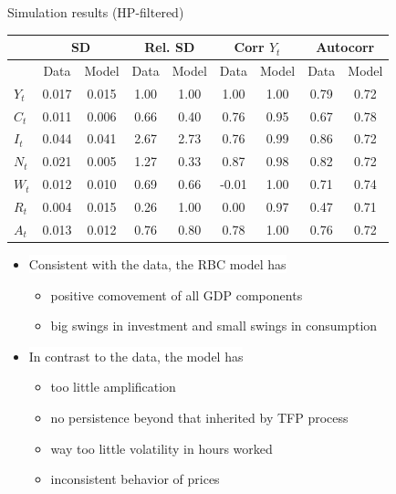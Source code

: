 \documentclass[9pt,xcolor={dvipsnames}]{beamer}
\newcommand{\bit}{\begin{itemize}}
\newcommand{\eit}{\end{itemize}}
\begin{document}
\begin{frame}{Simulation results (HP-filtered)}

\begin{table}[h!]
	\centering
	\begin{tabular}{|l|cc|cc|cc|cc|}
		\multicolumn{1}{c}{} &\multicolumn{2}{c}{\textbf{SD}}&\multicolumn{2}{c}{\textbf{Rel. SD}}& \multicolumn{2}{c}{\textbf{Corr $Y_t$}} & \multicolumn{2}{c}{\textbf{Autocorr}}  \\
		\hline
		& Data &Model & Data & Model & Data & Model & Data & Model \\
		\hline
		$Y_t$ & 0.017 & 0.015 & 1.00 & 1.00 & 1.00 & 1.00 & 0.79 & 0.72 \\
		\hline
		$C_t$ & 0.011 & 0.006  & 0.66 & 0.40 & 0.76 & 0.95  & 0.67 & 0.78 \\
		\hline
		$I_t$ & 0.044 & 0.041 & 2.67 & 2.73  & 0.76 & 0.99 & 0.86 & 0.72 \\
		\hline
		$N_t$ & 0.021 &  0.005 & 1.27 & 0.33 & 0.87 &  0.98 & 0.82 & 0.72 \\
		\hline
		$W_t$ & 0.012 & 0.010 & 0.69 & 0.66 & -0.01 & 1.00 & 0.71 & 0.74 \\
		\hline
		$R_t$ & 0.004 & 0.015  & 0.26 & 1.00 & 0.00 & 0.97 & 0.47 & 0.71 \\
		\hline
		$A_t$ & 0.013 & 0.012 & 0.76 & 0.80  & 0.78 & 1.00 & 0.76 & 0.72 \\
		\hline
	\end{tabular}
	\captionsetup{font=small}
	\label{sim_results}
\end{table} 

\bit
\setlength\itemsep{1em}

\item \colorbox{white}{{\color{white}Consistent with the data, the RBC model has}}
\bit
\item {\color{white} positive comovement of all GDP components}
\item {\color{white} big swings in investment and small swings in consumption}
\eit


\item \colorbox{white}{{\color{white}In contrast to the data, the model has}}
\bit
\item {\color{white} too little amplification}
\item {\color{white} no persistence beyond that inherited by TFP process}
\item {\color{white} way too little volatility in hours worked}
\item {\color{white} inconsistent behavior of prices}
\eit

\eit

\end{frame}
\end{document}
